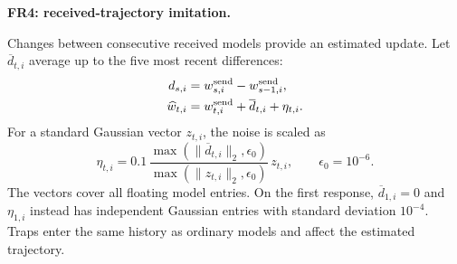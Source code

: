 \documentclass[conference]{IEEEtran}
\begin{document}
\par\medskip\noindent\textbf{FR4: received-trajectory imitation.}\par\nopagebreak\smallskip\noindent
Changes between consecutive received models provide an estimated update.
Let $\overline d_{t,i}$ average up to the five most recent differences:
\begin{align}
 d_{s,i}&=w^{\rm send}_{s,i}-w^{\rm send}_{s-1,i},\\
 \widehat w_{t,i}&=w^{\rm send}_{t,i}+\overline d_{t,i}+\eta_{t,i}.
\end{align}
For a standard Gaussian vector $z_{t,i}$, the noise is scaled as
\begin{equation}\label{eq:fr4-noise}
 \eta_{t,i}=0.1\,
 \frac{\max(\|\overline d_{t,i}\|_2,\epsilon_0)}
      {\max(\|z_{t,i}\|_2,\epsilon_0)}\,z_{t,i},
 \qquad\epsilon_0=10^{-6}.
\end{equation}
The vectors cover all floating model entries. On the first response,
$\overline d_{1,i}=0$ and $\eta_{1,i}$ instead has independent Gaussian entries with
standard deviation $10^{-4}$. Traps enter the same history as ordinary
models and affect the estimated trajectory.
\end{document}
